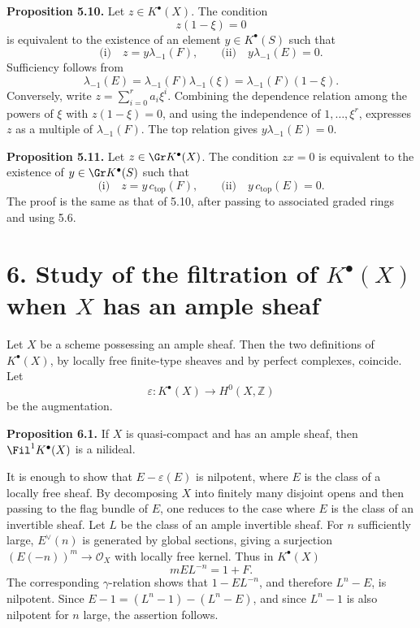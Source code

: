 \textbf{Proposition 5.10.} Let \(z\in K^\bullet(X)\). The condition
\[
  z(1-\xi)=0
\]
is equivalent to the existence of an element \(y\in K^\bullet(S)\) such that
\[
  \text{(i)}\quad z=y\lambda_{-1}(F),
  \qquad
  \text{(ii)}\quad y\lambda_{-1}(E)=0.
\]
Sufficiency follows from
\[
  \lambda_{-1}(E)=\lambda_{-1}(F)\lambda_{-1}(\xi)=\lambda_{-1}(F)(1-\xi).
\]
Conversely, write \(z=\sum_{i=0}^r a_i\xi^i\). Combining the dependence relation among the powers of \(\xi\) with \(z(1-\xi)=0\), and using the independence of \(1,\ldots,\xi^r\), expresses \(z\) as a multiple of \(\lambda_{-1}(F)\). The top relation gives \(y\lambda_{-1}(E)=0\).

\textbf{Proposition 5.11.} Let \(z\in \Gr K^\bullet(X)\). The condition \(zx=0\) is equivalent to the existence of \(y\in \Gr K^\bullet(S)\) such that
\[
  \text{(i)}\quad z=y\,c_{\mathrm{top}}(F),
  \qquad
  \text{(ii)}\quad y\,c_{\mathrm{top}}(E)=0.
\]
The proof is the same as that of 5.10, after passing to associated graded rings and using 5.6.

\section*{6. Study of the filtration of \(K^\bullet(X)\) when \(X\) has an ample sheaf}

Let \(X\) be a scheme possessing an ample sheaf. Then the two definitions of \(K^\bullet(X)\), by locally free finite-type sheaves and by perfect complexes, coincide. Let
\[
  \varepsilon:K^\bullet(X)\longrightarrow H^0(X,\mathbb Z)
\]
be the augmentation.

\textbf{Proposition 6.1.} If \(X\) is quasi-compact and has an ample sheaf, then \(\Fil^1 K^\bullet(X)\) is a nilideal.

It is enough to show that \(E-\varepsilon(E)\) is nilpotent, where \(E\) is the class of a locally free sheaf. By decomposing \(X\) into finitely many disjoint opens and then passing to the flag bundle of \(E\), one reduces to the case where \(E\) is the class of an invertible sheaf. Let \(L\) be the class of an ample invertible sheaf. For \(n\) sufficiently large, \(E^\vee(n)\) is generated by global sections, giving a surjection \((E(-n))^m\to \mathcal O_X\) with locally free kernel. Thus in \(K^\bullet(X)\)
\[
  mEL^{-n}=1+F.
\]
The corresponding \(\gamma\)-relation shows that \(1-EL^{-n}\), and therefore \(L^n-E\), is nilpotent. Since \(E-1=(L^n-1)-(L^n-E)\), and since \(L^n-1\) is also nilpotent for \(n\) large, the assertion follows.

